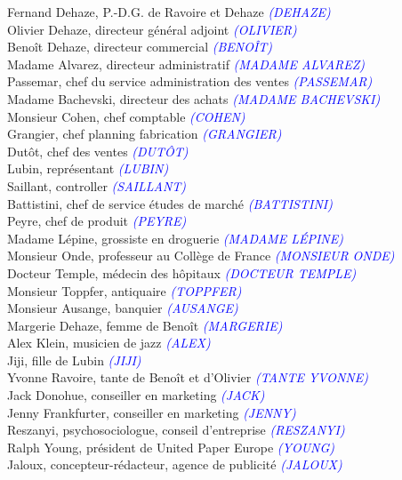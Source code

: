 \documentclass[a4paper]{report}
\newcommand{\annot}[1]{{\footnotesize \textcolor{blue}{\textit{(#1)}}}}
\begin{document}
\begin{center}
Fernand Dehaze, P.-D.G. de Ravoire et Dehaze \annot{DEHAZE}\\
Olivier Dehaze, directeur général adjoint \annot{OLIVIER}\\
Benoît Dehaze, directeur commercial \annot{BENOÎT}\\
Madame Alvarez, directeur administratif \annot{MADAME ALVAREZ}\\
Passemar, chef du service administration des ventes \annot{PASSEMAR}\\
Madame Bachevski, directeur des achats \annot{MADAME BACHEVSKI}\\
Monsieur Cohen, chef comptable \annot{COHEN}\\
Grangier, chef planning fabrication \annot{GRANGIER}\\
Dutôt, chef des ventes \annot{DUTÔT}\\
Lubin, représentant \annot{LUBIN}\\
Saillant, controller \annot{SAILLANT}\\
Battistini, chef de service études de marché \annot{BATTISTINI}\\
Peyre, chef de produit \annot{PEYRE}\\
Madame Lépine, grossiste en droguerie \annot{MADAME LÉPINE}\\
Monsieur Onde, professeur au Collège de France \annot{MONSIEUR ONDE}\\
Docteur Temple, médecin des hôpitaux \annot{DOCTEUR TEMPLE}\\
Monsieur Toppfer, antiquaire \annot{TOPPFER}\\
Monsieur Ausange, banquier \annot{AUSANGE}\\
Margerie Dehaze, femme de Benoît \annot{MARGERIE}\\
Alex Klein, musicien de jazz \annot{ALEX}\\
Jiji, fille de Lubin \annot{JIJI}\\
Yvonne Ravoire, tante de Benoît et d'Olivier \annot{TANTE YVONNE}\\
Jack Donohue, conseiller en marketing \annot{JACK}\\
Jenny Frankfurter, conseiller en marketing \annot{JENNY}\\
Reszanyi, psychosociologue, conseil d'entreprise \annot{RESZANYI}\\
Ralph Young, président de United Paper Europe \annot{YOUNG}\\
Jaloux, concepteur-rédacteur, agence de publicité \annot{JALOUX}\\
\end{center}
\end{document}
